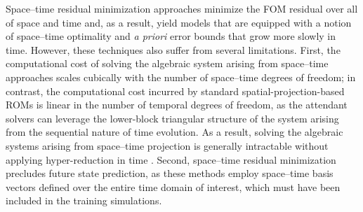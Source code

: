 \documentclass[3p,computermodern,10pt]{elsarticle}
\begin{document}

Space--time residual minimization approaches minimize the FOM residual over all of space and time and, as a result, yield models that are equipped with a notion of space--time optimality and \textit{a priori} error bounds that grow more slowly
in time.
However, these techniques also suffer from several
limitations. First, the computational cost of solving the algebraic system arising from space--time
approaches scales cubically with the number of space--time degrees of freedom;
in contrast, the computational cost incurred by standard
spatial-projection-based ROMs is linear in the number of temporal degrees of
freedom, as the attendant solvers can leverage the lower-block triangular
structure of the system arising from the sequential nature of time
evolution. As a result, solving the algebraic systems arising from space--time
projection is generally intractable without applying hyper-reduction in time
\cite{choi_stlspg,constantine_strom}. Second, space--time residual
minimization precludes future
state prediction, as these methods employ space--time basis vectors defined over the
entire time domain of interest, which must have been included in the training
simulations.
\end{document}
